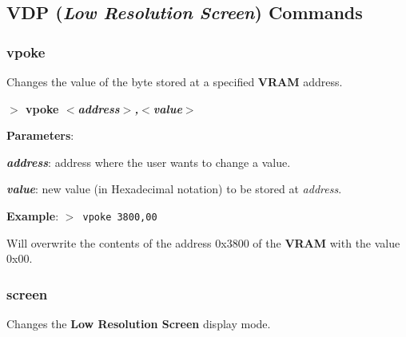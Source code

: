 \documentclass[a4paper,11pt]{article}
\begin{document}



        

    \subsection{VDP (\textit{Low Resolution Screen}) Commands}\label{vdpcmds}
        \subsubsection{{\color{blue}vpoke}}
        Changes the value of the byte stored at a specified \textbf{VRAM}
        address.

        \hspace{1.9cm}\textbf{$>$ vpoke \textit{$<$address$>$,$<$value$>$}}

        \textbf{Parameters}:

        \hspace{1cm}\textbf{\textit{address}}: address where the user wants
        to change a value.
        
        \hspace{1cm}\textbf{\textit{value}}: new value (in Hexadecimal notation)
        to be stored at \textit{address}.

        \textbf{Example}: \texttt{$>$ vpoke 3800,00}

        Will overwrite the contents of the address 0x3800 of the \textbf{VRAM}
        with the value 0x00.

        \subsubsection{{\color{blue}screen}}
        Changes the \textbf{Low Resolution Screen} display mode.
\end{document}
